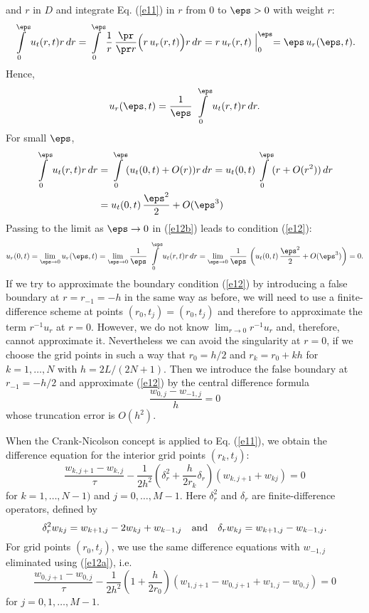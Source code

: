 \begin{example}
and $r$ in $D$ and integrate Eq. (\ref{e11}) in $r$ from $0$ to $\eps>0$ with weight $r$:
\[
\int\limits_{0}^{\eps}u_{t}(r,t) r \, dr = \int\limits_{0}^{\eps}\frac{1}{r}\, \frac{\pr}{\pr r}\Bigl(r \, u_{r}(r,t)\Bigr) r \, dr
=r \, u_{r}(r,t)\Bigm\vert_{0}^{\eps}= \eps \, u_{r}(\eps,t).
\]
Hence,
\begin{equation}
u_{r}(\eps,t)=\frac{1}{\eps} \, \int\limits_{0}^{\eps}u_{t}(r,t) r \, dr .  \label{e12b}
\end{equation}
For small $\eps$,
\[\begin{split}
\int\limits_{0}^{\eps}u_{t}(r,t) r \, dr &= \int\limits_{0}^{\eps}(u_{t}(0,t)+O(r)) r \, dr=
u_{t}(0,t)\int\limits_{0}^{\eps} (r + O(r^2)) \, dr \\
&=u_{t}(0,t) \, \frac{\eps^2}{2} + O(\eps^3)
\end{split}\]
Passing to the limit as $\eps\to 0$ in (\ref{e12b}) leads to condition (\ref{e12}):
\[
u_{r}(0,t)=\lim_{\eps\to 0} u_{r}(\eps,t)=\lim_{\eps\to 0} \frac{1}{\eps} \, \int\limits_{0}^{\eps}u_{t}(r,t) r \, dr
=\lim_{\eps\to 0} \frac{1}{\eps} \, \left(u_{t}(0,t) \, \frac{\eps^2}{2} + O(\eps^3) \right)=0.
\]
If we try to approximate the boundary condition (\ref{e12}) by introducing a false boundary at $r=r_{-1}=-h$ in the same way as before,
we will need to use a finite-difference scheme at points $(r_{0},t_j)=(r_{0},t_j)$ and therefore to approximate the term $r^{-1}u_{r}$ at $r=0$.
However, we do not know $\lim_{r\to 0}r^{-1}u_{r}$ and, therefore, cannot approximate it. Nevertheless we can avoid the singularity at $r=0$, if we choose
the grid points in such a way that $r_{0}=h/2$ and $r_{k}=r_0+k h$ for $k=1,\dots,N$ with $h=2L/(2N+1)$. Then we introduce the false boundary at $r_{-1}=-h/2$ and approximate
(\ref{e12}) by the central difference formula
\begin{equation}
\frac{w_{0,j}-w_{-1,j}}{h}=0  \label{e12a}
\end{equation}
whose truncation error is $O(h^2)$.

When the Crank-Nicolson concept is applied to Eq. (\ref{e11}),
we obtain the difference equation for the interior grid points $(r_k,t_j)$:
\begin{equation}
\frac{w_{k,j+1}-w_{k,j}}{\tau}-
\frac{1}{2h^2}\left(\delta_{r}^2+\frac{h}{2r_{k}}\delta_{r}\right)
\left(w_{k,j+1}+w_{kj}\right)=0  \label{e13}
\end{equation}
for $k=1,\dots,N-1)$ and $j=0,\dots,M-1$.
Here $\delta^2_{r}$ and $\delta_{r}$ are finite-difference operators, defined
by
\begin{equation}
\delta^2_{r}w_{kj}=w_{k+1,j}-2w_{kj}+w_{k-1,j} \quad {\rm and} \quad
\delta_{r}w_{kj}=w_{k+1,j}-w_{k-1,j}.  \label{e14}
\end{equation}
For grid points $(r_0,t_j)$, we use the same difference equations with $w_{-1,j}$ eliminated using
(\ref{e12a}), i.e.
\begin{equation}
\frac{w_{0,j+1}-w_{0,j}}{\tau}-
\frac{1}{2h^2}\left(1+\frac{h}{2r_{0}}\right)
\left(w_{1,j+1}-w_{0,j+1}+w_{1,j}-w_{0,j}\right)=0 
\end{equation}
for $j=0, 1, \dots, M-1$.

\end{example}
 
